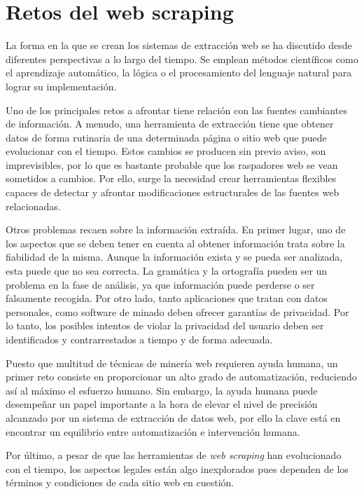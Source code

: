 \section{Retos del web scraping}
\label{sec:retos del web scraping}

La forma en la que se crean los sistemas de extracción web se ha discutido desde diferentes perspectivas
a lo largo del tiempo. Se emplean métodos científicos como el aprendizaje automático, la lógica o el
procesamiento del lenguaje natural para lograr su implementación.

Uno de los principales retos a afrontar tiene relación con las fuentes cambiantes de información. A menudo,
una herramienta de extracción tiene que obtener datos de forma rutinaria de una determinada página o sitio
web que puede evolucionar con el tiempo. Estos cambios se producen sin previo aviso, son imprevisibles,
por lo que es bastante probable que los raspadores web se vean sometidos a cambios. Por ello, surge la
necesidad crear herramientas flexibles capaces de detectar y afrontar modificaciones estructurales de las
fuentes web relacionadas.

Otros problemas recaen sobre la información extraída. En primer lugar, uno de los aspectos que se deben
tener en cuenta al obtener información trata sobre la fiabilidad de la misma. Aunque la información
exista y se pueda ser analizada, esta puede que no sea correcta. La gramática y la ortografía pueden ser
un problema en la fase de análisis, ya que información puede perderse o ser falsamente recogida. Por otro
lado, tanto aplicaciones que tratan con datos personales, como software de minado deben ofrecer garantías
de privacidad. Por lo tanto, los posibles intentos de violar la privacidad del usuario deben ser
identificados y contrarrestados a tiempo y de forma adecuada.

Puesto que multitud de técnicas de minería web requieren ayuda humana, un primer reto consiste en
proporcionar un alto grado de automatización, reduciendo así al máximo el esfuerzo humano. Sin embargo,
la ayuda humana puede desempeñar un papel importante a la hora de elevar el nivel de precisión alcanzado
por un sistema de extracción de datos web, por ello la clave está en encontrar un equilibrio entre
automatización e intervención humana.

Por último, a pesar de que las herramientas de \emph{web scraping} han evolucionado con el tiempo, los 
aspectos legales están algo inexplorados pues dependen de los términos y condiciones de cada sitio web en 
cuestión.

